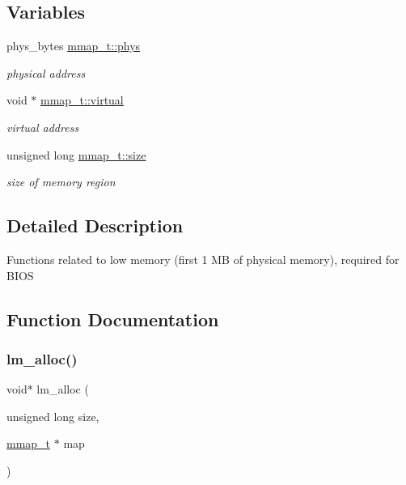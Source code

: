 \subsection*{Variables}
\begin{DoxyCompactItemize}
\item 
phys\+\_\+bytes \hyperlink{group__lmlib_gaa6ac1ee0e0fadea4a4f85b48c8359ae4}{mmap\+\_\+t\+::phys}
\begin{DoxyCompactList}\small\item\em physical address \end{DoxyCompactList}\item 
void $\ast$ \hyperlink{group__lmlib_ga4de93144fb3ffbceb9bd1f3009d6d98c}{mmap\+\_\+t\+::virtual}
\begin{DoxyCompactList}\small\item\em virtual address \end{DoxyCompactList}\item 
unsigned long \hyperlink{group__lmlib_gaf1cdc5384a402fddf33f400a5e1e5e45}{mmap\+\_\+t\+::size}
\begin{DoxyCompactList}\small\item\em size of memory region \end{DoxyCompactList}\end{DoxyCompactItemize}


\subsection{Detailed Description}
Functions related to low memory (first 1 MB of physical memory), required for B\+I\+OS 

\subsection{Function Documentation}
\hypertarget{group__lmlib_gae45d971ce2ffcf4dc2677eba033a92cd}{}\label{group__lmlib_gae45d971ce2ffcf4dc2677eba033a92cd} 
\subsubsection{\texorpdfstring{lm\+\_\+alloc()}{lm\_alloc()}}
{\footnotesize\ttfamily void$\ast$ lm\+\_\+alloc (\begin{DoxyParamCaption}\item[{unsigned long}]{size,  }\item[{\hyperlink{structmmap__t}{mmap\+\_\+t} $\ast$}]{map }\end{DoxyParamCaption})}




